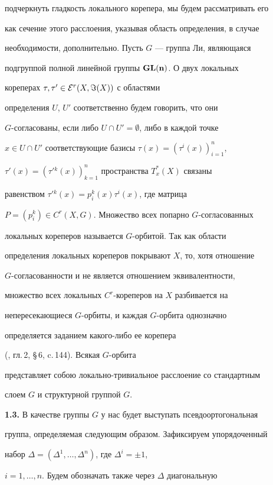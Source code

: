 подчеркнуть гладкость локального корепера, мы будем рассматривать его


как сечение этого расслоения, указывая область определения, в случае


необходимости, дополнительно. Пусть $G$ --- группа Ли, являющаяся


подгруппой полной линейной группы $\bold{GL(n)}$. О двух локальных


кореперах $\tau,\tau'\in{\cal E}^r(X,\Im(X))$ с областями


определения $U$, $U'$ соответственно будем говорить, что они


$G$-со\-гла\-со\-ва\-ны, если либо $U\cap U'=\emptyset$, либо в каждой точке


$x\in U\cap U'$ соответствующие базисы $\tau(x)=(\tau^i(x))_{i=1}^n$,


$\tau'(x)=(\tau'{}^k(x))_{k=1}^n$ пространства $T^*_x(X)$ связаны


равенством $\tau'{}^k(x)=p^k_i(x)\tau^i(x)$, где матрица


$P= (p^k_i)\in C^r(X,G)$. Множество всех попарно $G$-согласованных


локальных кореперов называется $G$-орбитой. Так как области


определения локальных кореперов покрывают $X$, то, хотя отношение


$G$-согласованности и не является отношением эквивалентности,


множество всех локальных $C^r$-кореперов на $X$ разбивается на


непересекающиеся $G$-орбиты, и каждая $G$-орбита однозначно


определяется заданием какого-либо ее корепера


(\cite{Zu}, гл.\,2, \S\,6, c.\,144). Всякая $G$-орбита


представляет собою локально-тривиальное расслоение со стандартным


слоем $G$ и структурной группой $G$.


\medskip





{\bf 1.3.} В качестве группы $G$ у нас будет выступать псевдоортогональная


группа, определяемая следующим образом. Зафиксируем упорядоченный


набор $\Delta=(\Delta^1,\dotsc,\Delta^n)$, где $\Delta^i=\pm 1$,


$i=1,\dotsc,n$. Будем обозначать также через $\Delta$ диагональную


